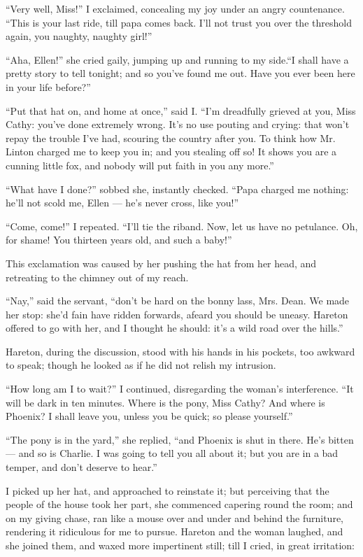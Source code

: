 \par “Very well, Miss!” I exclaimed, concealing my joy under an angry countenance. “This is your last ride, till papa comes back. I'll not trust you over the threshold again, you naughty, naughty girl!”
\par “Aha, Ellen!” she cried gaily, jumping up and running to my side.“I shall have a pretty story to tell tonight; and so you've found me out. Have you ever been here in your life before?”
\par “Put that hat on, and home at once,” said I. “I'm dreadfully grieved at you, Miss Cathy: you've done extremely wrong. It's no use pouting and crying: that won't repay the trouble I've had, scouring the country after you. To think how Mr. Linton charged me to keep you in; and you stealing off so! It shows you are a cunning little fox, and nobody will put faith in you any more.”
\par “What have I done?” sobbed she, instantly checked. “Papa charged me nothing: he'll not scold me, Ellen — he's never cross, like you!”
\par “Come, come!” I repeated. “I'll tie the riband. Now, let us have no petulance. Oh, for shame! You thirteen years old, and such a baby!”
\par This exclamation was caused by her pushing the hat from her head, and retreating to the chimney out of my reach.
\par “Nay,” said the servant, “don't be hard on the bonny lass, Mrs. Dean. We made her stop: she'd fain have ridden forwards, afeard you should be uneasy. Hareton offered to go with her, and I thought he should: it's a wild road over the hills.”
\par Hareton, during the discussion, stood with his hands in his pockets, too awkward to speak; though he looked as if he did not relish my intrusion.
\par “How long am I to wait?” I continued, disregarding the woman's interference. “It will be dark in ten minutes. Where is the pony, Miss Cathy? And where is Phoenix? I shall leave you, unless you be quick; so please yourself.”
\par “The pony is in the yard,” she replied, “and Phoenix is shut in there. He's bitten — and so is Charlie. I was going to tell you all about it; but you are in a bad temper, and don't deserve to hear.”
\par I picked up her hat, and approached to reinstate it; but perceiving that the people of the house took her part, she commenced capering round the room; and on my giving chase, ran like a mouse over and under and behind the furniture, rendering it ridiculous for me to pursue. Hareton and the woman laughed, and she joined them, and waxed more impertinent still; till I cried, in great irritation:

